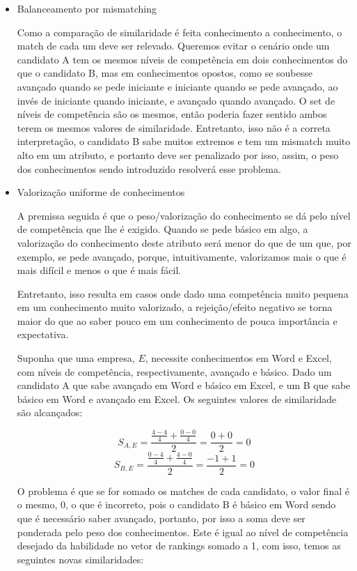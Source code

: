 \documentclass[preprint,12pt]{elsarticle}
\begin{document}
\begin{itemize}
    \begin{itemize}
       \item Balanceamento por mismatching
       
       Como a comparação de similaridade é feita conhecimento a conhecimento, o match de cada um deve ser relevado. Queremos evitar o cenário onde um candidato A tem os mesmos níveis de competência em dois conhecimentos do que o candidato B, mas em conhecimentos opostos, como se soubesse avançado quando se pede iniciante e iniciante quando se pede avançado, ao invés de iniciante quando iniciante, e avançado quando avançado. O set de níveis de competência são os mesmos, então poderia fazer sentido ambos terem os mesmos valores de similaridade. Entretanto, isso não é a correta interpretação, o candidato B sabe muitos extremos e tem um mismatch muito alto em um atributo, e portanto deve ser penalizado por isso, assim, o peso dos conhecimentos sendo introduzido resolverá esse problema.
       
       \item Valorização uniforme de conhecimentos
        
        A premissa seguida é que o peso/valorização do conhecimento se dá pelo nível de competência que lhe é exigido. Quando se pede básico em algo, a valorização do conhecimento deste atributo será menor do que de um que, por exemplo, se pede avançado, porque, intuitivamente, valorizamos mais o que é mais difícil e menos o que é mais fácil. 
        
        Entretanto, isso resulta em casos onde dado uma competência muito pequena em um conhecimento muito valorizado, a rejeição/efeito negativo se torna maior do que ao saber pouco em um conhecimento de pouca importância e expectativa.
        
        Suponha que uma empresa, $E$, necessite conhecimentos em Word e Excel, com níveis de competência, respectivamente, avançado e básico. Dado um candidato A que sabe avançado em Word e básico em Excel, e um B que sabe básico em Word e avançado em Excel. Os seguintes valores de similaridade são alcançados:
    
        $$ S_{A,E} = \frac{\tfrac{4 - 4}{4} + \tfrac{0 - 0}{4}}{2} = \frac{0 + 0}{2} =  0 $$
        $$ S_{B,E} = \frac{\tfrac{0 - 4}{4} + \tfrac{4 - 0}{4}}{2} = \frac{-1 + 1}{2} =  0 $$
        
        O problema é que se for somado os matches de cada candidato, o valor final é o mesmo, 0, o que é incorreto, pois o candidato B é básico em Word sendo que é necessário saber avançado, portanto, por isso a soma deve ser ponderada pelo peso dos conhecimentos. Este é igual ao nível de competência desejado da habilidade no vetor de rankings somado a 1, com isso, temos as seguintes novas similaridades:
        

\end{itemize}
\end{itemize}
\end{document}
